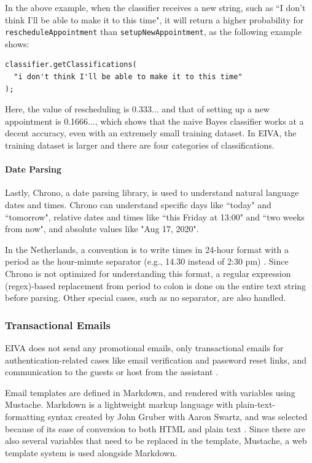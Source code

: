 \documentclass{article}
\begin{document}
In the above example, when the classifier receives a new string, such as ``I don't think I'll be able to make it to this time", it will return a higher probability for \texttt{rescheduleAppointment} than \texttt{setupNewAppointment}, as the following example shows:

\begin{verbatim}
classifier.getClassifications(
  "i don't think I'll be able to make it to this time"
);
\end{verbatim}

Here, the value of rescheduling is 0.333... and that of setting up a new appointment is 0.1666..., which shows that the naive Bayes classifier works at a decent accuracy, even with an extremely small training dataset. In EIVA, the training dataset is larger and there are four categories of classifications.

\paragraph{Date Parsing}

Lastly, Chrono, a date parsing library, is used to understand natural language dates and times. Chrono can understand specific days like ``today" and ``tomorrow", relative dates and times like ``this Friday at 13:00" and ``two weeks from now", and absolute values like "Aug 17, 2020".

In the Netherlands, a convention is to write times in 24-hour format with a period as the hour-minute separator (e.g., 14.30 instead of 2:30 pm) \cite{noauthor_8h30_nodate}. Since Chrono is not optimized for understanding this format, a regular expression (regex)-based replacement from period to colon is done on the entire text string before parsing. Other special cases, such as no separator, are also handled.

\subsubsection{Transactional Emails}

EIVA does not send any promotional emails, only transactional emails for authentication-related cases like email verification and password reset links, and communication to the guests or host from the assistant \cite{noauthor_everything_2018}.

Email templates are defined in Markdown, and rendered with variables using Mustache. Markdown is a lightweight markup language with plain-text-formatting syntax created by John Gruber with Aaron Swartz, and was selected because of its ease of conversion to both HTML and plain text \cite{noauthor_daring_nodate}. Since there are also several variables that need to be replaced in the template, Mustache, a web template system is used alongside Markdown.
\end{document}
